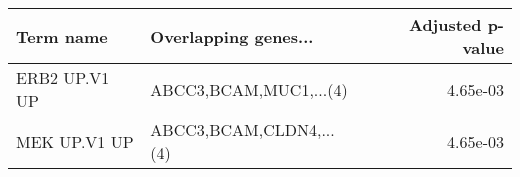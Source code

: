 \begin{tabular}{llr}
\toprule
    Term name &    Overlapping genes... &  Adjusted p-value \\
\midrule
ERB2 UP.V1 UP &  ABCC3,BCAM,MUC1,...(4) &          4.65e-03 \\
 MEK UP.V1 UP & ABCC3,BCAM,CLDN4,...(4) &          4.65e-03 \\
\bottomrule
\end{tabular}

